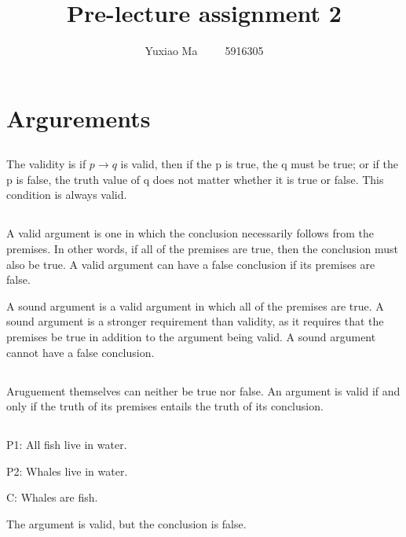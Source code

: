 \documentclass[UTF8,a4paper,AutoFakeBold,AutoFakeSlant]{article}
\title{\textbf{\textsf{{\textsf{Pre-lecture assignment 2}}}}}
\author{\tnewroman Yuxiao Ma~~~~~5916305}
\date{}
\begin{document}
\maketitle


\section{Argurements}

\subsection{}

The validity is if $p \rightarrow q$ is valid, then if the p is true, the q must be true; 
or if the p is false, the truth value of q does not matter whether it is true or false. This condition is always valid.


\subsection{}

A valid argument is one in which the conclusion necessarily follows from the premises. In other words, if all of the premises are true, then the conclusion must also be true.
A valid argument can have a false conclusion if its premises are false.

A sound argument is a valid argument in which all of the premises are true. A sound argument is a stronger requirement than validity, as it requires that the premises be true in addition to the argument being valid.
A sound argument cannot have a false conclusion.


\subsection{}

Aruguement themselves can neither be true nor false.
An argument is valid if and only if the truth of its premises entails the truth of its conclusion.


\subsection{}

P1: All fish live in water.

P2: Whales live in water.

C: Whales are fish.

The argument is valid, but the conclusion is false.
\end{document}
